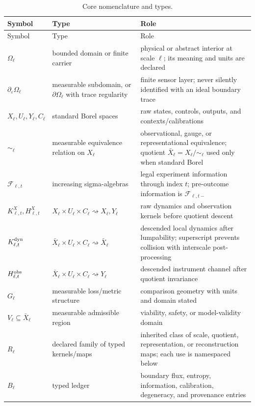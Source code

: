 \documentclass[11pt,a4paper]{article}
\theoremstyle{definition}
\theoremstyle{plain}
\theoremstyle{remark}
\begin{document}
\begin{longtable}{L{0.18\textwidth}L{0.31\textwidth}L{0.42\textwidth}}
\caption{Core nomenclature and types.}\label{tab:types}\\
\toprule
Symbol & Type & Role\\
\midrule
\endfirsthead
\toprule
Symbol & Type & Role\\
\midrule
\endhead
\(\Omega_\ell\) & bounded domain or finite carrier & physical or abstract
interior at scale \(\ell\); its meaning and units are declared\\
\(\partial_\varepsilon\Omega_\ell\) & measurable subdomain, or
\(\partial\Omega_\ell\) with trace regularity & finite sensor layer; never
silently identified with an ideal boundary trace\\
\(X_\ell,U_\ell,Y_\ell,C_\ell\) & standard Borel spaces & raw states,
controls, outputs, and contexts/calibrations\\
\(\sim_\ell\) & measurable equivalence relation on \(X_\ell\) &
observational, gauge, or representational equivalence; quotient
\(\bar X_\ell=X_\ell/{\sim_\ell}\) used only when standard Borel\\
\(\mathcal F_{\ell,t}\) & increasing sigma-algebras & legal experiment
information through index \(t\); pre-outcome information is
\(\mathcal F_{\ell,t-}\)\\
\(K_{\ell,t}^{X},H_{\ell,t}^{X}\) &
\(X_\ell\times U_\ell\times C_\ell\rightsquigarrow X_\ell,Y_\ell\) &
raw dynamics and observation kernels before quotient descent\\
\(K_{\ell,t}^{\rm dyn}\) &
\(\bar X_\ell\times U_\ell\times C_\ell\rightsquigarrow\bar X_\ell\) &
descended local dynamics after lumpability; superscript prevents collision with interscale
post-processing\\
\(H_{\ell,t}^{\rm obs}\) &
\(\bar X_\ell\times U_\ell\times C_\ell\rightsquigarrow Y_\ell\) &
descended instrument channel after quotient invariance\\
\(G_\ell\) & measurable loss/metric structure & comparison geometry with
units and domain stated\\
\(V_\ell\subseteq\bar X_\ell\) & measurable admissible region & viability,
safety, or model-validity domain\\
\(R_\ell\) & declared family of typed kernels/maps & inherited class of
scale, quotient, representation, or reconstruction maps; each use is
namespaced below\\
\(B_\ell\) & typed ledger & boundary flux, entropy, information,
calibration, degeneracy, and provenance entries\\

\end{longtable}
\end{document}
